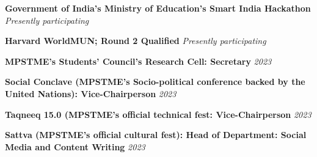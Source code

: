 \vspace{-3mm} 

\begin{cventries}
	
\customcventry
	{\textbf{Government of India's Ministry of Education's Smart India Hackathon}} %
	{} %
	{}%
	{\textit{Presently participating}} %
	{}
\vspace{-3.5mm} 

\customcventry
	{\textbf{Harvard WorldMUN; Round 2 Qualified}} %
	{} %
	{}%
	{\textit{Presently participating}} %
	{}
\vspace{-3.5mm} 

\customcventry
	{\textbf{MPSTME's Students' Council's Research Cell: Secretary}} %
	{} %
	{}%
	{\textit{2023}} %
	{}
\vspace{-3.5mm} 

 \customcventry
	{\textbf{Social Conclave (MPSTME's Socio-political conference backed by the United Nations): Vice-Chairperson}} %
	{} %
	{}%
	{\textit{2023}} %
	{}
\vspace{-3.5mm} 

 \customcventry
	{\textbf{Taqneeq 15.0 (MPSTME’s official technical fest: Vice-Chairperson}} %
	{} %
	{}%
	{\textit{2023}} %
	{}
\vspace{-3.5mm} 

 \customcventry
	{\textbf{Sattva (MPSTME’s official cultural fest): Head of Department: Social Media and Content Writing}} %
	{} %
	{}%
	{\textit{2023}} %
	{}
\vspace{-3.5mm} 




\vspace{-6.0mm}  

 
\end{cventries}
